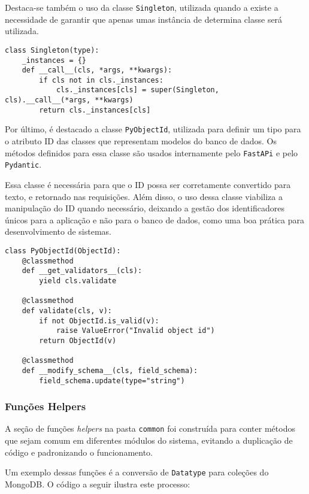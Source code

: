 Destaca-se também o uso da classe \texttt{Singleton}, utilizada quando a existe a necessidade de garantir que apenas umas instância de determina classe será utilizada.

\begin{verbatim}
class Singleton(type):
    _instances = {}
    def __call__(cls, *args, **kwargs):
        if cls not in cls._instances:
            cls._instances[cls] = super(Singleton, cls).__call__(*args, **kwargs)
        return cls._instances[cls]
\end{verbatim}

Por último, é destacado a classe \texttt{PyObjectId}, utilizada para definir um tipo para o atributo ID das classes que representam modelos do banco de dados. Os métodos definidos para essa classe são usados internamente pelo \texttt{FastAPi} e pelo \texttt{Pydantic}.

Essa classe é necessária para que o ID possa ser corretamente convertido para texto, e retornado nas requisições. Além disso, o uso dessa classe viabiliza a manipulação do ID quando necessário, deixando a gestão dos identificadores únicos para a aplicação e não para o banco de dados, como uma boa prática para desenvolvimento de sistemas.

\begin{verbatim}
class PyObjectId(ObjectId):
    @classmethod
    def __get_validators__(cls):
        yield cls.validate

    @classmethod
    def validate(cls, v):
        if not ObjectId.is_valid(v):
            raise ValueError("Invalid object id")
        return ObjectId(v)

    @classmethod
    def __modify_schema__(cls, field_schema):
        field_schema.update(type="string")
\end{verbatim}

\subsubsection{Funções Helpers}

A seção de funções \textit{helpers} na pasta \texttt{common} foi construída para conter métodos que sejam comum em diferentes módulos do sistema, evitando a duplicação de código e padronizando o funcionamento.

Um exemplo dessas funções é a conversão de \texttt{Datatype} para coleções do MongoDB. O código a seguir ilustra este processo:

